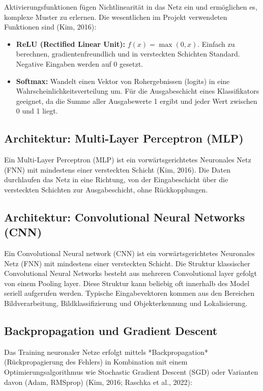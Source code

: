Aktivierungsfunktionen fügen Nichtlinearität in das Netz ein und ermöglichen es, komplexe Muster zu erlernen. Die wesentlichen im Projekt verwendeten Funktionen sind (Kim, 2016):

\begin{itemize}
    \item \textbf{ReLU (Rectified Linear Unit):} $f(x) = \max(0, x)$. Einfach zu berechnen, gradientenfreundlich und in versteckten Schichten Standard. Negative Eingaben werden auf 0 gesetzt.
    \item \textbf{Softmax:} Wandelt einen Vektor von Rohergebnissen (logits) in eine Wahrscheinlichkeitsverteilung um. Für die Ausgabeschicht eines Klassifikators geeignet, da die Summe aller Ausgabewerte 1 ergibt und jeder Wert zwischen 0 und 1 liegt.
\end{itemize}

\subsection{Architektur: Multi-Layer Perceptron (MLP)}
Ein Multi-Layer Perceptron (MLP) ist ein vorwärtsgerichtetes Neuronales Netz (FNN) mit mindestens einer versteckten Schicht (Kim, 2016). Die Daten durchlaufen das Netz in eine Richtung, von der Eingabeschicht über die versteckten Schichten zur Ausgabeschicht, ohne Rückkopplungen.

\subsection{Architektur: Convolutional Neural Networks (CNN)}

Ein Convolutional Neural network (CNN) ist ein vorwärtsgerichtetes Neuronales Netz (FNN) mit mindestens einer versteckten Schicht. Die Struktur klassischer Convolutional Neural Networks besteht aus mehreren Convolutional layer gefolgt von einem Pooling layer. Diese Struktur kann beliebig oft innerhalb des Model seriell aufgerufen werden. Typische Eingabevektoren kommen aus den Bereichen Bildverarbeitung, Bildklassifizierung und Objekterkennung und Lokalisierung.

\subsection{Backpropagation und Gradient Descent}

Das Training neuronaler Netze erfolgt mittels *Backpropagation* (Rückpropagierung des Fehlers) in Kombination mit einem Optimierungsalgorithmus wie Stochastic Gradient Descent (SGD) oder Varianten davon (Adam, RMSprop) (Kim, 2016; Raschka et al., 2022):

